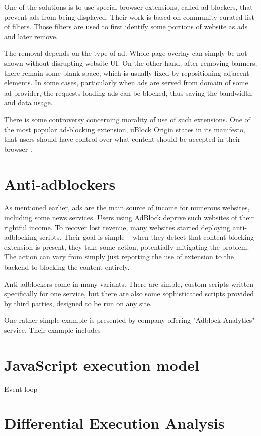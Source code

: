 \documentclass[en]{pracamgr}
\begin{document}
One of the solutions is to use special browser extensions, called ad blockers, that prevent ads from being displayed.
Their work is based on community-curated list of filters. Those filters are used to first identify some portions
of website as ads and later remove.

The removal depends on the type of ad. Whole page overlay can simply be not shown without disrupting
website UI. On the other hand, after removing banners, there remain some blank space, which is usually
fixed by repositioning adjacent elements. In some cases, particularly when ads are served from domain
of some ad provider, the requests loading ads can be blocked, thus saving the bandwidth and data usage.

There is some controversy concerning morality of use of such extensions.
One of the most popular ad-blocking extension, uBlock Origin states in its manifesto,
that users should have control over what content should be accepted in their browser \cite{ublock:manifesto}.



\section{Anti-adblockers}
As mentioned earlier, ads are the main source of income for numerous websites, including some 
news services. Users using AdBlock deprive such websites of their rightful income.
To recover lost revenue, many websites started deploying anti-adblocking scripts.
Their goal is simple -- when they detect that content blocking extension is present, 
they take some action, potentially mitigating the problem.
The action can vary from simply just reporting the use of extension to the backend to blocking 
the content entirely.

Anti-adblockers come in many variants. There are simple, custom scripts written 
specifically for one service, but there are also some sophisticated scripts 
provided by third parties, designed to be run on any site.

One rather simple example is presented by company offering "Adblock Analytics" service.
Their example includes 

\section{JavaScript execution model}
Event loop \cite{mozilla:event-loop}

\section{Differential Execution Analysis}
\end{document}
